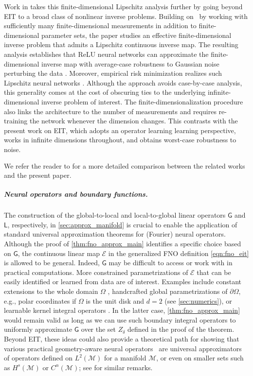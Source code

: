\documentclass[pdflatex,sn-mathphys-num]{sn-jnl-preprint}
\newcommand{\cE}{\mathcal{E}}
\newcommand{\cM}{\mathcal{M}}
\newcommand{\sfG}{\mathsf{G}}
\newcommand{\sfL}{\mathsf{L}}
\newcommand{\pOmega}{{\partial\Omega}}
\newcommand{\al}{\alpha}
\theoremstyle{thmstyleone}%
\theoremstyle{thmstyletwo}%
\theoremstyle{thmstylethree}%
\numberwithin{equation}{section}
\numberwithin{theorem}{section}
\begin{document}
Work in \cite{pineda2023deep} takes this finite-dimensional Lipschitz analysis further by going beyond EIT to a broad class of nonlinear inverse problems. Building on~\cite{alberti2022infinite} by working with sufficiently many finite-dimensional measurements in addition to finite-dimensional parameter sets, the paper \cite{pineda2023deep} studies an effective finite-dimensional inverse problem that admits a Lipschitz continuous inverse map. The resulting analysis establishes that ReLU neural networks can approximate the finite-dimensional inverse map with average-case robustness to Gaussian noise perturbing the data \cite[Thm.~3.9]{pineda2023deep}. Moreover, empirical risk minimization realizes such Lipschitz neural networks \cite[Thm.~4.3]{pineda2023deep}. Although the approach avoids case-by-case analysis, this generality comes at the cost of obscuring ties to the underlying infinite-dimensional inverse problem of interest. The finite-dimensionalization procedure also links the architecture to the number of measurements and requires re-training the network whenever the dimension changes. This contrasts with the present work on EIT, which adopts an operator learning learning perspective, works in infinite dimensions throughout, and obtains worst-case robustness to noise.

We refer the reader to \cite[Sec.~4.3.1--4.3.2]{nelsen2025operator} for a more detailed comparison between the related works \cite{castro2024calderon,abhishek2024solving,pineda2023deep} and the present paper.


\subparagraph*{\emph{\textbf{Neural operators and boundary functions.}}}
The construction of the global-to-local and local-to-global linear operators $\sfG$ and $\sfL$, respectively, in \cref{sec:approx_manifold} is crucial to enable the application of standard universal approximation theorems for (Fourier) neural operators. Although the proof of \cref{thm:fno_approx_main} identifies a specific choice based on $\sfG$, the continuous linear map $\cE$ in the generalized FNO definition \eqref{eqn:fno_eit} is allowed to be general. Indeed, $\sfG$ may be difficult to access or work with in practical computations. More constrained parametrizations of $\cE$ that can be easily identified or learned from data are of interest. Examples include constant extensions to the whole domain $\Omega$ \cite{de2022cost}, handcrafted global parametrizations of $\pOmega$, e.g., polar coordinates if $\Omega$ is the unit disk and $d=2$ (see \cref{sec:numerics}), or learnable kernel integral operators \cite[Sec.~3.5, pp.~18--19]{wu2025learning}.
In the latter case, \cref{thm:fno_approx_main} would remain valid as long as we can use such boundary integral operators to uniformly approximate $\sfG$ over the set $Z_\delta$ defined in the proof of the theorem. Beyond EIT, these ideas could also provide a theoretical path for showing that various practical geometry-aware neural operators~\cite{li2023fourier,li2023geometry,li2025geometric,chen2024learning,wu2024neural} are universal approximators of operators defined on $L^2(\cM)$ for a manifold $\cM$, or even on smaller sets such as $H^s(\cM)$ or $C^\al(\cM)$; see \cite[p.~7]{lanthaler2023nonlocality} for similar remarks.
\end{document}
